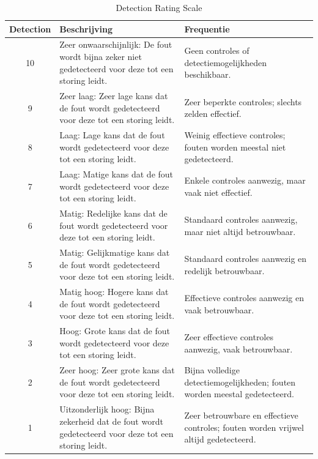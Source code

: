 \documentclass{article}
\begin{document}
\begin{table}[h!]
  \centering
  \begin{tabular}{|c|p{6.5cm}|p{6.5cm}|}
    \hline
    \textbf{Detection} & \textbf{Beschrijving} & \textbf{Frequentie}\\ 
    \hline
      10 
    & Zeer onwaarschijnlijk: De fout wordt bijna zeker niet gedetecteerd voor deze tot een storing leidt.	&
    Geen controles of detectiemogelijkheden beschikbaar.\\
    \hline
    9&
    Zeer laag: Zeer lage kans dat de fout wordt gedetecteerd voor deze tot een storing leidt.	&
    Zeer beperkte controles; slechts zelden effectief.\\
    \hline
    8&
    Laag: Lage kans dat de fout wordt gedetecteerd voor deze tot een storing leidt.	&
    Weinig effectieve controles; fouten worden meestal niet gedetecteerd.\\
    \hline
    7&
    Laag: Matige kans dat de fout wordt gedetecteerd voor deze tot een storing leidt.	&
    Enkele controles aanwezig, maar vaak niet effectief.\\
    \hline
    6&
    Matig: Redelijke kans dat de fout wordt gedetecteerd voor deze tot een storing leidt.	&
    Standaard controles aanwezig, maar niet altijd betrouwbaar.\\
    \hline
    5&
    Matig: Gelijkmatige kans dat de fout wordt gedetecteerd voor deze tot een storing leidt.	&
    Standaard controles aanwezig en redelijk betrouwbaar.\\
    \hline
    4&
    Matig hoog: Hogere kans dat de fout wordt gedetecteerd voor deze tot een storing leidt.	&
    Effectieve controles aanwezig en vaak betrouwbaar.\\
    \hline
    3	&
    Hoog: Grote kans dat de fout wordt gedetecteerd voor deze tot een storing leidt.	&
    Zeer effectieve controles aanwezig, vaak betrouwbaar.\\
    \hline
    2	&
    Zeer hoog: Zeer grote kans dat de fout wordt gedetecteerd voor deze tot een storing leidt.	&
    Bijna volledige detectiemogelijkheden; fouten worden meestal gedetecteerd.\\
    \hline
    1	&
    Uitzonderlijk hoog: Bijna zekerheid dat de fout wordt gedetecteerd voor deze tot een storing leidt.	&
    Zeer betrouwbare en effectieve controles; fouten worden vrijwel altijd gedetecteerd.\\
    \hline
  \end{tabular}
\caption{Detection Rating Scale}
\label{tab:Detection}
\end{table}
\end{document}
